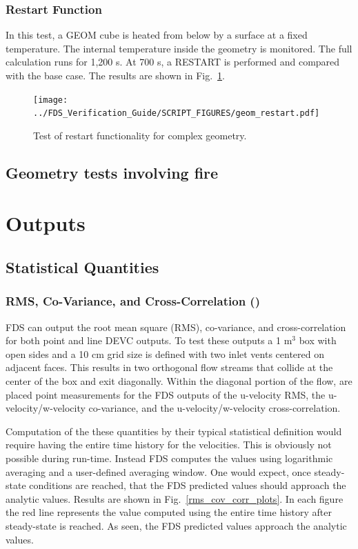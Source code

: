 \documentclass[11pt]{book}
\begin{document}
\subsection{Restart Function}
\label{geom_restart}

In this test, a GEOM cube is heated from below by a surface at a fixed temperature.  The internal temperature inside the geometry is monitored.  The full calculation runs for 1,200 s.  At 700 s, a {\ct RESTART} is performed and compared with the base case.  The results are shown in Fig.~\ref{fig:geom_restart}.
\begin{figure}[ht]
\centering
\texttt{[image: ../FDS\_Verification\_Guide/SCRIPT\_FIGURES/geom\_restart.pdf]}
\caption[The {\ct geom\_restart} test case]{Test of restart functionality for complex geometry.}
\label{fig:geom_restart}
\end{figure}


\section{Geometry tests involving fire}

\fi


\chapter{Outputs}

\section{Statistical Quantities}

\subsection{RMS, Co-Variance, and Cross-Correlation (\texorpdfstring{}{rms\_cov\_corr})}

FDS can output the root mean square (RMS), co-variance, and cross-correlation for both point and line {\ct DEVC} outputs.  To test these outputs a 1 m$^3$ box with open sides and a 10 cm grid size is defined with two inlet vents centered on adjacent faces.  This results in two orthogonal flow streams that collide at the center of the box and exit diagonally.  Within the diagonal portion of the flow, are placed point measurements for the FDS outputs of the u-velocity RMS, the u-velocity/w-velocity co-variance, and the u-velocity/w-velocity cross-correlation.

Computation of the these quantities by their typical statistical definition would require having the entire time history for the velocities.  This is obviously not possible during run-time.  Instead FDS computes the values using logarithmic averaging and a user-defined averaging window.  One would expect, once steady-state conditions are reached, that the FDS predicted values should approach the analytic values.  Results are shown in Fig.~\ref{rms_cov_corr_plots}.  In each figure the red line represents the value computed using the entire time history after steady-state is reached.  As seen, the FDS predicted values approach the analytic values.
\end{document}
